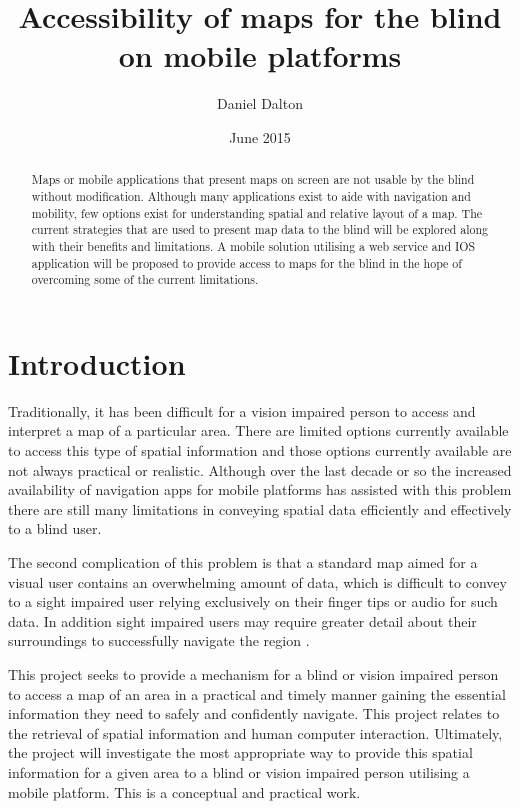 \documentclass[11pt,twoside,a4paper]{article}
\begin{document}
\title{Accessibility of maps for the blind on mobile platforms}
\author{Daniel Dalton}
\date{June 2015}
\maketitle
\tableofcontents

\begin{abstract}
Maps or mobile applications that present maps on screen are not usable
by the blind without modification. Although many applications exist to
aide with navigation and mobility, few options exist for understanding
spatial and relative layout of a map.
The current strategies that are used
to present map data to the blind will be explored along with
their benefits and limitations. A mobile solution utilising a web
service and IOS application will be proposed to provide access to maps
for the blind in the hope of overcoming some of the current limitations.
\end{abstract}

\section{Introduction}
Traditionally, it has been difficult for a vision impaired person to
access and interpret a map of a particular area. There are limited
options currently available to access this type of spatial information
and those options currently available are not always practical or
realistic. Although over the last decade or so the increased
availability of navigation apps for mobile platforms has assisted with
this problem there are still many limitations in conveying spatial data
efficiently and effectively to a blind user.

The second complication of this problem is that a standard map aimed for
a visual user contains an overwhelming amount of data, which is
difficult to convey to a sight impaired user relying exclusively on
their finger tips or audio for such data. In addition sight impaired
users may require greater detail about their surroundings to
successfully navigate the region \cite{Haptimap2012}.

This project seeks to provide a mechanism for a blind or vision impaired
person to access a map of an area in a practical and timely manner
gaining the essential information they need to safely and confidently
navigate. This project relates to the retrieval of spatial information and human
computer interaction. Ultimately, the project will investigate the most
appropriate way to provide this spatial information for a given area to
a blind or vision impaired person utilising a mobile platform. This is a
conceptual and practical work.
\end{document}
